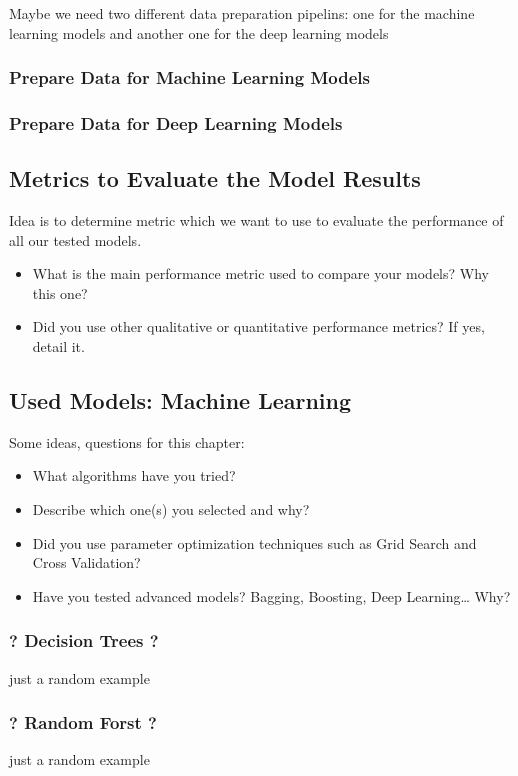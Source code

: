 \documentclass{article}
\begin{document}
Maybe we need two different data preparation pipelins: one for the machine learning models and another one for the deep learning models

\subsubsection{Prepare Data for Machine Learning Models}


\subsubsection{Prepare Data for Deep Learning Models}

\subsection{Metrics to Evaluate the Model Results}

Idea is to determine metric which we want to use to evaluate the performance of all our tested models.
\begin{itemize}
    \item What is the main performance metric used to compare your models? Why
    this one?
    \item Did you use other qualitative or quantitative performance metrics? If yes,
    detail it.
\end{itemize}


\subsection{Used Models: Machine Learning}
Some ideas, questions for this chapter:

\begin{itemize}
    \item What algorithms have you tried?
    \item Describe which one(s) you selected and why?
    \item Did you use parameter optimization techniques such as Grid Search and Cross Validation?
    \item Have you tested advanced models? Bagging, Boosting, Deep Learning… Why?
\end{itemize}

\subsubsection{? Decision Trees ?}
just a random example
\subsubsection{? Random Forst ?}
just a random example
\end{document}

